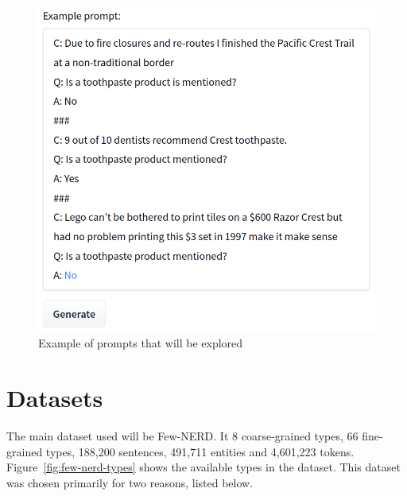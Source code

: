 \documentclass[a4paper, 11pt]{article}
\begin{document}
\begin{figure}
\centering
\includegraphics[scale=0.33]{example-prompts}
\caption{Example of prompts that will be explored}
\label{fig:example-prompts}
\end{figure}

\section{Datasets}

The main dataset used will be Few-NERD\cite{few-nerd}. It 8 coarse-grained types, 66 fine-grained types, 188,200 sentences, 491,711 entities and 4,601,223 tokens\cite{few-nerd}. Figure~\ref{fig:few-nerd-types} shows the available types in the dataset. This dataset was chosen primarily for two reasons, listed below.
\end{document}
